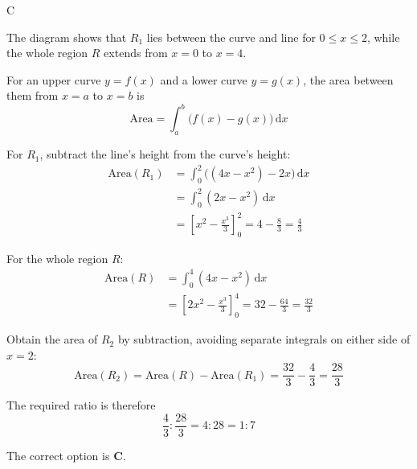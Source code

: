 \documentclass[11pt,a4paper]{article}
\begin{document}
\begin{enumerate}[label=\textbf{\arabic*.},leftmargin=*,itemsep=0pt,start=18]
\begin{djsSolution}{C}
\begin{djsSolutionFigure}
\end{djsSolutionFigure}

The diagram shows that $R_1$ lies between the curve and line for $0\leq x\leq2$, while the whole region $R$ extends from $x=0$ to $x=4$.

For an upper curve $y=f(x)$ and a lower curve $y=g(x)$, the area between them from $x=a$ to $x=b$ is
\[
\text{Area}=\int_a^b\bigl(f(x)-g(x)\bigr)\,\mathrm{d}x
\]

For $R_1$, subtract the line's height from the curve's height:
\[
\begin{aligned}
\text{Area}(R_1)
&=\int_0^2\bigl((4x-x^2)-2x\bigr)\,\mathrm{d}x\\[8pt]
&=\int_0^2(2x-x^2)\,\mathrm{d}x\\[8pt]
&=\left[x^2-\frac{x^3}{3}\right]_0^2
=4-\frac83=\frac43
\end{aligned}
\]

For the whole region $R$:
\[
\begin{aligned}
\text{Area}(R)
&=\int_0^4(4x-x^2)\,\mathrm{d}x\\[8pt]
&=\left[2x^2-\frac{x^3}{3}\right]_0^4
=32-\frac{64}{3}=\frac{32}{3}
\end{aligned}
\]

Obtain the area of $R_2$ by subtraction, avoiding separate integrals on either side of $x=2$:
\[
\text{Area}(R_2)=\text{Area}(R)-\text{Area}(R_1)
=\frac{32}{3}-\frac43=\frac{28}{3}
\]

The required ratio is therefore
\[
\frac43:\frac{28}{3}=4:28=\boxed{1:7}
\]

The correct option is \textbf{C}.
\end{djsSolution}
\end{enumerate}
\end{document}
